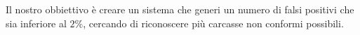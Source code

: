 Il nostro obbiettivo è creare un sistema che generi un numero di falsi positivi che sia inferiore al $2\%$, cercando di riconoscere più carcasse non conformi possibili.





